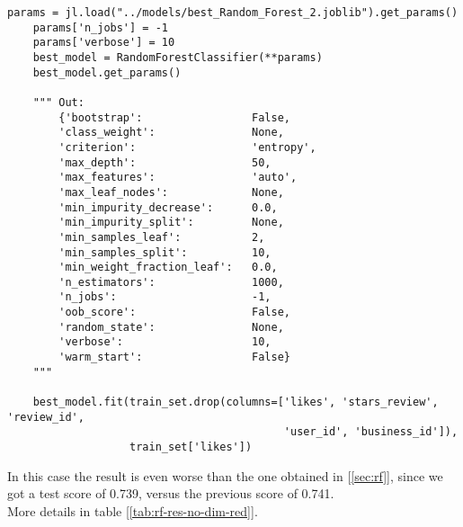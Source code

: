 \begin{lstlisting}[caption={Random Forest without dimensionality reduction},label={lst:rf-no-dim-red}]
    params = jl.load("../models/best_Random_Forest_2.joblib").get_params()
    params['n_jobs'] = -1
    params['verbose'] = 10
    best_model = RandomForestClassifier(**params)
    best_model.get_params()
    
    """ Out:
        {'bootstrap':                 False,
        'class_weight':               None,
        'criterion':                  'entropy',
        'max_depth':                  50,
        'max_features':               'auto',
        'max_leaf_nodes':             None,
        'min_impurity_decrease':      0.0,
        'min_impurity_split':         None,
        'min_samples_leaf':           2,
        'min_samples_split':          10,
        'min_weight_fraction_leaf':   0.0,
        'n_estimators':               1000,
        'n_jobs':                     -1,
        'oob_score':                  False,
        'random_state':               None,
        'verbose':                    10,
        'warm_start':                 False}
    """
    
    best_model.fit(train_set.drop(columns=['likes', 'stars_review', 'review_id',
                                           'user_id', 'business_id']), 
                   train_set['likes'])
\end{lstlisting}

In this case the result is even worse than the one obtained in [\ref{sec:rf}], since we got a test score of 0.739, versus the previous score of 0.741.\\
More details in table [\ref{tab:rf-res-no-dim-red}].


